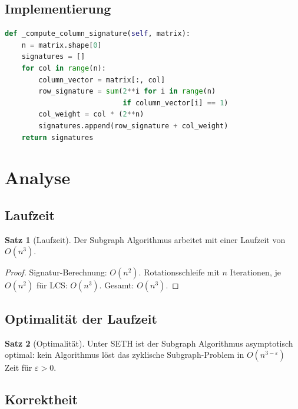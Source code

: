 ﻿\documentclass[a4paper,12pt]{article}
\theoremstyle{definition}
\newtheorem{satz}{Satz}[section]
\begin{document}
\subsection{Implementierung}

\begin{lstlisting}[language=Python, caption=Signatur-Berechnung]
def _compute_column_signature(self, matrix):
    n = matrix.shape[0]
    signatures = []
    for col in range(n):
        column_vector = matrix[:, col]
        row_signature = sum(2**i for i in range(n)
                            if column_vector[i] == 1)
        col_weight = col * (2**n)
        signatures.append(row_signature + col_weight)
    return signatures
\end{lstlisting}

\section{Analyse}

\subsection{Laufzeit}

\begin{satz}[Laufzeit]
	Der Subgraph Algorithmus arbeitet mit einer Laufzeit von $O(n^3)$.
\end{satz}

\begin{proof}
	Signatur-Berechnung: $O(n^2)$. Rotationsschleife mit $n$ Iterationen,
	je $O(n^2)$ f\"ur LCS: $O(n^3)$. Gesamt: $O(n^3)$.
\end{proof}

\subsection{Optimalit\"at der Laufzeit}

\begin{satz}[Optimalit\"at]
	Unter SETH ist der Subgraph Algorithmus asymptotisch optimal:
	kein Algorithmus l\"ost das zyklische Subgraph-Problem in $O(n^{3-\varepsilon})$
	Zeit f\"ur $\varepsilon > 0$.
\end{satz}

\subsection{Korrektheit}
\end{document}
